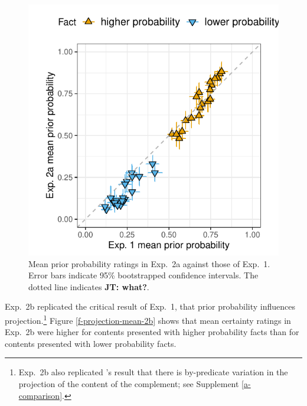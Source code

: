 \documentclass[11pt,fleqn]{article}
\newcommand{\jt}[1]{\textbf{\color{blue}JT: #1}}
\newcommand{\6}{\mbox{$[\hspace*{-.6mm}[$}}
\newcommand{\9}{\mbox{$]\hspace*{-.6mm}]$}}
\newcommand{\citepos}[1]{\citeauthor{#1}'s \citeyear{#1}}
\begin{document}
\begin{figure}[h!]
\centering

\includegraphics[width=.4\paperwidth]{../../results/1-prior/graphs/prior-probability-comparison-exp1-exp2}

\caption{Mean prior probability ratings in Exp.~2a against those of Exp.~1. Error bars indicate 95\% bootstrapped confidence intervals. The dotted line indicates \jt{what?}.}
\label{f-prior-comparison}
\end{figure}

Exp.~2b replicated the critical result of Exp.~1, that prior probability influences projection.\footnote{Exp.~2b also replicated \citepos{tonhauser-degen-factive} result that there is by-predicate variation in the projection of the content of the complement; see Supplement \ref{a-comparison}.} Figure \ref{f-projection-mean-2b} shows that mean certainty ratings in Exp.~2b were higher for contents presented with higher probability facts than for contents presented with lower probability facts.
\end{document}
